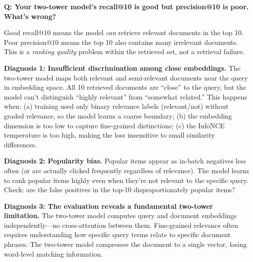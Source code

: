 \begin{interviewq}
\textbf{Q: Your two-tower model's recall@10 is good but precision@10 is poor. What's wrong?}

 \quad {} \quad \badgefreq{\freqmed}

\stronganswer

Good recall@10 means the model \textit{can} retrieve relevant documents in the top 10. Poor precision@10 means the top 10 also contains many irrelevant documents. This is a \textit{ranking quality} problem within the retrieved set, not a retrieval failure.

\textbf{Diagnosis 1: Insufficient discrimination among close embeddings.} The two-tower model maps both relevant and semi-relevant documents near the query in embedding space. All 10 retrieved documents are ``close'' to the query, but the model can't distinguish ``highly relevant'' from ``somewhat related.'' This happens when: (a) training used only binary relevance labels (relevant/not) without graded relevance, so the model learns a coarse boundary; (b) the embedding dimension is too low to capture fine-grained distinctions; (c) the InfoNCE temperature is too high, making the loss insensitive to small similarity differences.

\textbf{Diagnosis 2: Popularity bias.} Popular items appear as in-batch negatives less often (or are actually clicked frequently regardless of relevance). The model learns to rank popular items highly even when they're not relevant to the specific query. Check: are the false positives in the top-10 disproportionately popular items?

\textbf{Diagnosis 3: The evaluation reveals a fundamental two-tower limitation.} The two-tower model computes query and document embeddings independently---no cross-attention between them. Fine-grained relevance often requires understanding how specific query terms relate to specific document phrases. The two-tower model compresses the document to a single vector, losing word-level matching information.


\end{interviewq}

